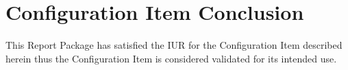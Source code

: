 \newpage
\section{Configuration Item Conclusion}
This Report Package has satisfied the IUR for the Configuration Item described
herein thus the Configuration Item is considered validated for its intended use.
